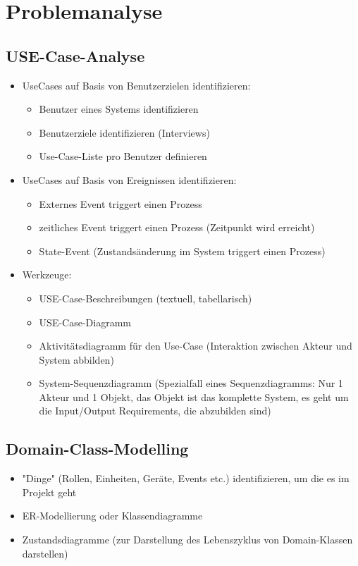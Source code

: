 \chapter{Problemanalyse}
\section{USE-Case-Analyse}
\begin{itemize}
	\item UseCases auf Basis von Benutzerzielen identifizieren: 
	\begin{itemize}
		\item Benutzer eines Systems identifizieren
		\item Benutzerziele identifizieren (Interviews)
		\item Use-Case-Liste pro Benutzer definieren
	\end{itemize}
	\item UseCases auf Basis von Ereignissen identifizieren: 
	\begin{itemize}
		\item Externes Event triggert einen Prozess
		\item zeitliches Event triggert einen Prozess (Zeitpunkt wird erreicht) 
		\item State-Event (Zustandsänderung im System triggert einen Prozess)
	\end{itemize}
	\item Werkzeuge:
	\begin{itemize}
		\item USE-Case-Beschreibungen (textuell, tabellarisch)
		\item USE-Case-Diagramm
		\item Aktivitätsdiagramm für den Use-Case (Interaktion zwischen Akteur und System abbilden)
		\item System-Sequenzdiagramm (Spezialfall eines Sequenzdiagramms: Nur 1 Akteur und 1 Objekt, das Objekt ist das komplette System, es geht um die Input/Output Requirements, die abzubilden sind)
	\end{itemize}
\end{itemize}

\section{Domain-Class-Modelling}
\begin{itemize}
	\item "Dinge" (Rollen, Einheiten, Geräte, Events etc.) identifizieren, um die es im Projekt geht
	\item ER-Modellierung oder Klassendiagramme
	\item Zustandsdiagramme (zur Darstellung des Lebenszyklus von Domain-Klassen darstellen)
\end{itemize}

